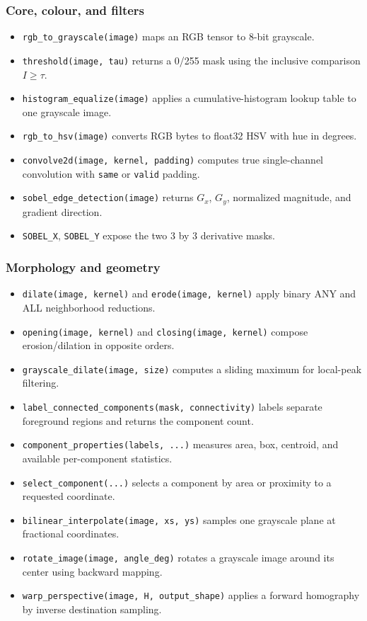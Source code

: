 \documentclass[11pt,a4paper]{article}
\newcommand{\1}{\mathbf{1}}
\begin{document}
\subsubsection{Core, colour, and filters}
\begin{itemize}
 \item \texttt{rgb\_to\_grayscale(image)} maps an RGB tensor to 8-bit grayscale.
 \item \texttt{threshold(image, tau)} returns a 0/255 mask using the inclusive comparison $I\ge\tau$.
 \item \texttt{histogram\_equalize(image)} applies a cumulative-histogram lookup table to one grayscale image.
 \item \texttt{rgb\_to\_hsv(image)} converts RGB bytes to float32 HSV with hue in degrees.
 \item \texttt{convolve2d(image, kernel, padding)} computes true single-channel convolution with \texttt{same} or \texttt{valid} padding.
 \item \texttt{sobel\_edge\_detection(image)} returns $G_x$, $G_y$, normalized magnitude, and gradient direction.
 \item \texttt{SOBEL\_X}, \texttt{SOBEL\_Y} expose the two 3 by 3 derivative masks.
\end{itemize}

\subsubsection{Morphology and geometry}
\begin{itemize}
 \item \texttt{dilate(image, kernel)} and \texttt{erode(image, kernel)} apply binary ANY and ALL neighborhood reductions.
 \item \texttt{opening(image, kernel)} and \texttt{closing(image, kernel)} compose erosion/dilation in opposite orders.
 \item \texttt{grayscale\_dilate(image, size)} computes a sliding maximum for local-peak filtering.
 \item \texttt{label\_connected\_components(mask, connectivity)} labels separate foreground regions and returns the component count.
 \item \texttt{component\_properties(labels, ...)} measures area, box, centroid, and available per-component statistics.
 \item \texttt{select\_component(...)} selects a component by area or proximity to a requested coordinate.
 \item \texttt{bilinear\_interpolate(image, xs, ys)} samples one grayscale plane at fractional coordinates.
 \item \texttt{rotate\_image(image, angle\_deg)} rotates a grayscale image around its center using backward mapping.
 \item \texttt{warp\_perspective(image, H, output\_shape)} applies a forward homography by inverse destination sampling.
\end{itemize}
\end{document}
